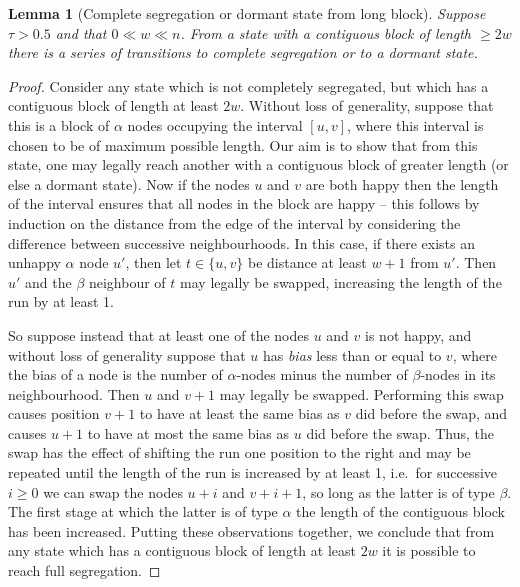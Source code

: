 \documentclass[11pt]{article}
\theoremstyle{plain}
\newtheorem{lem}[thm]{Lemma}
\numberwithin{equation}{subsection}
\begin{document}
\begin{lem}[Complete segregation or dormant state from long block]\label{le:complsegdromslb}
Suppose  $\tau>0.5$ and that $0\ll w \ll n$. From a state with a contiguous block of length $\geq 2w$
there is a series of transitions to complete segregation or to a dormant state.
\end{lem}
\begin{proof}
Consider any state which is not completely segregated, but which has a contiguous block of length at least $2w$. Without loss of generality, suppose that this is a block  of  $\alpha$ nodes  occupying the interval $[u,v]$, where this interval is chosen to be of maximum possible length. Our aim is to show that from this state, one may legally reach another with a contiguous block of greater length (or else a dormant state).   Now if the nodes $u$ and $v$ are both happy then the length of the interval ensures that all nodes in the block are happy -- this follows by induction on the distance from the edge of the interval by considering the difference between successive neighbourhoods. In this case, if there exists  an unhappy $\alpha$ node $u'$, then  let $t\in \{ u,v \}$ be distance at least $w+1$ from $u'$.  Then $u'$ and the $\beta$ neighbour of $t$ may legally be swapped, increasing the length of the run by at least 1.  
 
  
 So suppose instead that at least one of the nodes  $u$ and $v$ is not happy, and without loss of generality  suppose that $u$ has \emph{bias} less than or equal to  $v$, where the bias of a node is the number of $\alpha$-nodes minus the number of $\beta$-nodes in its neighbourhood. Then $u$ and  $v+1$ may legally be swapped. Performing this swap causes position $v+1$ to have at least the same bias as $v$ did before the swap, and causes  $u+1$ to have at most the same bias as $u$ did before the swap. Thus, the swap has the effect of shifting the run one position to the right and may be repeated until the length of the run is increased by at least 1, i.e.\  for successive $i\geq 0$ we can swap the nodes $u+i$ and $v+i+1$, so long as the latter is of type $\beta$. The first stage at which the latter is of type $\alpha$ the length of the contiguous block has been increased.  Putting these observations together,  we conclude that from any state which  has a contiguous block of length at least $2w$ it is possible to reach full segregation. 
\end{proof}
\end{document}
